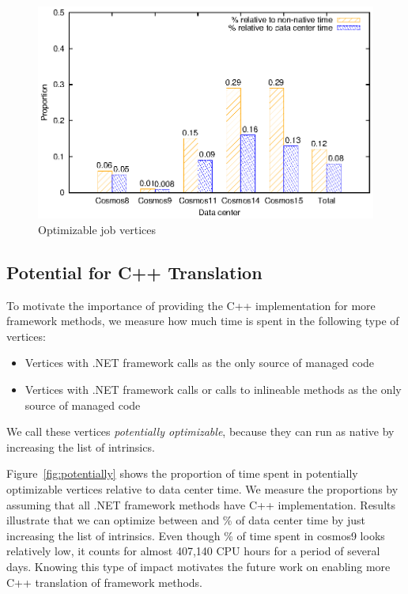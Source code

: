 \begin{figure}[ht]
\includegraphics[width=\columnwidth]{graphs/optimizable2}
\caption{Optimizable job vertices}
\label{fig:optimizable}
\end{figure}

\subsection{Potential for C++ Translation}
To motivate the importance of providing the C++ implementation for more framework methods, we measure how much time is spent in the following type of vertices:
\begin{itemize}
\item Vertices with .NET framework calls as the only source of managed code
\item Vertices with .NET framework calls or calls to inlineable methods as the only source of managed code
\end{itemize}
We call these vertices \emph{potentially optimizable}, because they can run as native by increasing the list of intrinsics.

Figure~\ref{fig:potentially} shows the proportion of time spent in potentially optimizable vertices relative to data center time. 
We measure the proportions by assuming that all .NET framework methods have C++ implementation.
Results illustrate that we can optimize between \potentiallyOptimizableL{} and \potentiallyOptimizableU{} \% of data center time by just increasing the list of intrinsics. 
Even though \potentiallyOptimizableL{} \% of time spent in cosmos9 looks relatively low, it counts for almost 407,140 CPU hours for a period of several days. 
Knowing this type of impact motivates the future work on enabling more C++ translation of framework methods.

